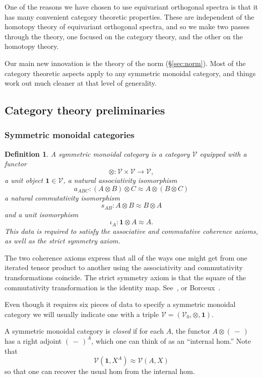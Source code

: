 \documentclass{amsart}
\newtheorem{definition}[equation]{Definition}
\newenvironment{defin}{\begin{definition}\rm}{\end{definition}}
\theoremstyle{definition}
\newtheorem{defin}[equation]{Definition}
\theoremstyle{remark}
\newcommand{\slot}{\,-\,}
\newcommand{\cat}[1]{{\mathcal #1}}
\newcommand{\one}{\mathbf{1}}
\begin{document}
One of the reasons we have chosen to use equivariant orthogonal
spectra is that it has many convenient category theoretic properties.
These are independent of the homotopy theory of equivariant
orthogonal spectra, and so we make two passes through the theory, one
focused on the category theory, and the other on the homotopy theory.

Our main new innovation is the theory of the norm (\S\ref{sec:norm}).
Most of the category theoretic aspects apply to any symmetric monoidal
category, and things work out much cleaner at that level of
generality.


\subsection{Category theory preliminaries}
\label{sec:categ-theory-prel}


\subsubsection{Symmetric monoidal categories}
\label{sec:symm-mono-categ}

\begin{defin}
\label{def:36}
A {\em symmetric monoidal category} is a category $\cat V$ equipped
with a functor 
\[
\otimes:\cat V\times\cat V\to \cat V,
\]
a unit object $\one\in \cat V$, a natural associativity isomorphism 
\[
a_{ABC}:(A\otimes B)\otimes C \approx A\otimes (B\otimes C)
\]
a natural commutativity isomorphism 
\[
s_{AB}:A\otimes B\approx B\otimes A
\]
and a unit isomorphism 
\[
\iota_{A}:\one\otimes A\approx A.
\]
This data is required to satisfy the associative and commutative
coherence axioms, as well as the strict symmetry axiom.
\end{defin}

The two coherence axioms express that all of the ways one might get
from one iterated tensor product to another using the associativity
and commutativity transformations coincide.  The strict symmetry axiom
is that the square of the commutativity transformation is the identity
map.  See~\cite{MR1712872}, or Borceux~\cite[\S6.1]{borceux2}.

Even though it requires six pieces of data to specify a symmetric
monoidal category we will usually indicate one with a triple $\cat
V=(\cat V_{0},\otimes,\one)$.

A symmetric monoidal category is {\em closed} if for each $A$, the
functor $A\otimes (\slot)$ has a right adjoint $(\slot)^{A}$, which
one can think of as an ``internal hom.''  Note that
\[
\cat V(\one, X^{A}) \approx \cat V(A,X)
\]
so that one can recover the usual hom from the internal hom.
\end{document}
